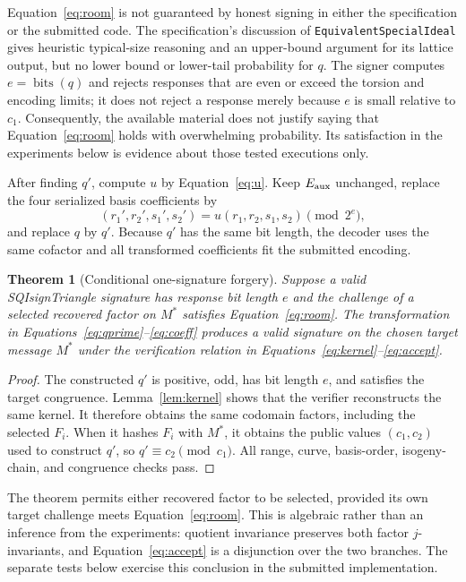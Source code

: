 \documentclass[11pt,a4paper]{article}
\newtheorem{theorem}{Theorem}
\newcommand{\bits}{\operatorname{bits}}
\begin{document}
Equation~\eqref{eq:room} is not guaranteed by honest signing in either the
specification or the submitted code. The specification's discussion of
\texttt{EquivalentSpecialIdeal} gives heuristic typical-size reasoning and an
upper-bound argument for its lattice output, but no lower bound or lower-tail
probability for $q$. The signer computes $e=\bits(q)$ and rejects responses
that are even or exceed the torsion and encoding limits; it does not reject a
response merely because $e$ is small relative to $c_1$. Consequently, the
available material does not justify saying that
Equation~\eqref{eq:room} holds with overwhelming probability. Its satisfaction
in the experiments below is evidence about those tested executions only.

After finding $q'$, compute $u$ by Equation~\eqref{eq:u}. Keep
$E_{\rm aux}$ unchanged, replace the four serialized basis coefficients by
\begin{equation}
 (r_1',r_2',s_1',s_2')
 =u(r_1,r_2,s_1,s_2)\pmod{2^e},
 \label{eq:coeff}
\end{equation}
and replace $q$ by $q'$. Because $q'$ has the same bit length, the decoder
uses the same cofactor and all transformed coefficients fit the submitted
encoding.

\begin{theorem}[Conditional one-signature forgery]
\label{thm:forgery}
Suppose a valid SQIsignTriangle signature has response bit length $e$ and the
challenge of a selected recovered factor on $M^*$ satisfies
Equation~\eqref{eq:room}. The transformation in
Equations~\eqref{eq:qprime}--\eqref{eq:coeff} produces a valid signature on
the chosen target message $M^*$ under the verification relation in
Equations~\eqref{eq:kernel}--\eqref{eq:accept}.
\end{theorem}

\begin{proof}
The constructed $q'$ is positive, odd, has bit length $e$, and satisfies the
target congruence. Lemma~\ref{lem:kernel} shows that the verifier reconstructs
the same kernel. It therefore obtains the same codomain factors, including
the selected $F_i$. When it hashes $F_i$ with $M^*$, it obtains the public
values $(c_1,c_2)$ used to construct $q'$, so
$q'\equiv c_2\pmod{c_1}$. All range, curve, basis-order, isogeny-chain, and
congruence checks pass.
\end{proof}

The theorem permits either recovered factor to be selected, provided its own
target challenge meets Equation~\eqref{eq:room}. This is algebraic rather than
an inference from the experiments: quotient invariance preserves both factor
$j$-invariants, and Equation~\eqref{eq:accept} is a disjunction over the two
branches. The separate tests below exercise this conclusion in the submitted
implementation.
\end{document}
